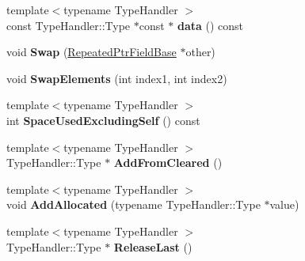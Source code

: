\begin{DoxyCompactItemize}
{\footnotesize template$<$typename Type\+Handler $>$ }\\const Type\+Handler\+::\+Type $\ast$const  $\ast$ {\bfseries data} () const
\item 
\mbox{\label{classgoogle_1_1protobuf_1_1internal_1_1RepeatedPtrFieldBase_a72eec78759956c1e56aa24f0ba8c580d}} 
void {\bfseries Swap} (\hyperlink{classgoogle_1_1protobuf_1_1internal_1_1RepeatedPtrFieldBase}{Repeated\+Ptr\+Field\+Base} $\ast$other)
\item 
\mbox{\label{classgoogle_1_1protobuf_1_1internal_1_1RepeatedPtrFieldBase_ad31a61ea305e380170bbedd71a9e203d}} 
void {\bfseries Swap\+Elements} (int index1, int index2)
\item 
\mbox{\label{classgoogle_1_1protobuf_1_1internal_1_1RepeatedPtrFieldBase_a3841160b013a1d762a39f271225da132}} 
{\footnotesize template$<$typename Type\+Handler $>$ }\\int {\bfseries Space\+Used\+Excluding\+Self} () const
\item 
\mbox{\label{classgoogle_1_1protobuf_1_1internal_1_1RepeatedPtrFieldBase_a5a79e50b835146dfc3657a17fead29d3}} 
{\footnotesize template$<$typename Type\+Handler $>$ }\\Type\+Handler\+::\+Type $\ast$ {\bfseries Add\+From\+Cleared} ()
\item 
\mbox{\label{classgoogle_1_1protobuf_1_1internal_1_1RepeatedPtrFieldBase_ae68132b4de64eaa301608bd1cad7c0ac}} 
{\footnotesize template$<$typename Type\+Handler $>$ }\\void {\bfseries Add\+Allocated} (typename Type\+Handler\+::\+Type $\ast$value)
\item 
\mbox{\label{classgoogle_1_1protobuf_1_1internal_1_1RepeatedPtrFieldBase_abcccbf97c7a729c26f0345499f2eff96}} 
{\footnotesize template$<$typename Type\+Handler $>$ }\\Type\+Handler\+::\+Type $\ast$ {\bfseries Release\+Last} ()
\item 

\end{DoxyCompactItemize}
